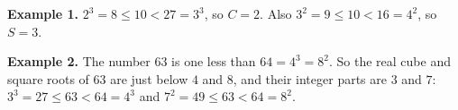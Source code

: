 \textbf{Example 1.} $2^3 = 8 \le 10 < 27 = 3^3$, so $C = 2$. Also $3^2 = 9 \le 10 < 16 = 4^2$, so $S = 3$.

\textbf{Example 2.} The number $63$ is one less than $64 = 4^3 = 8^2$. So the real cube and square roots of $63$ are just below $4$ and $8$, and their integer parts are $3$ and $7$: $3^3 = 27 \le 63 < 64 = 4^3$ and $7^2 = 49 \le 63 < 64 = 8^2$.
